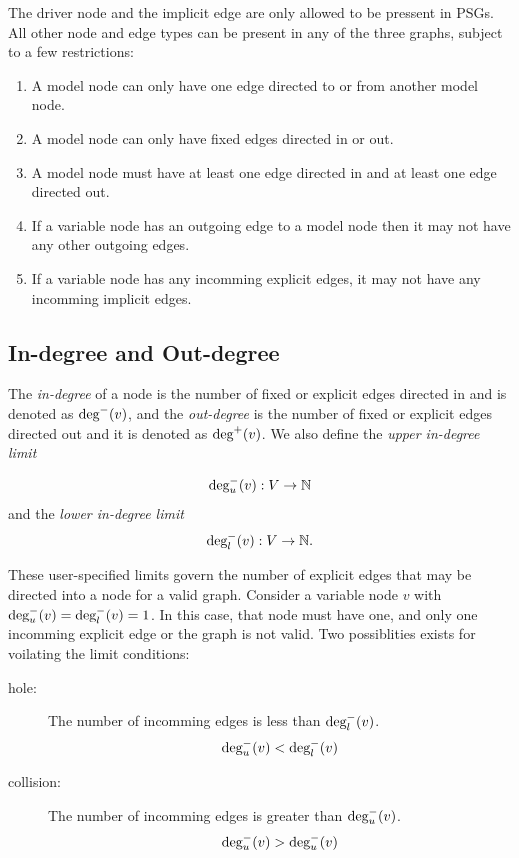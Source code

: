 The driver node and the implicit edge are only allowed to be pressent in PSGs. All 
other node and edge types can be present in any of the three graphs, subject to a 
few restrictions: 
\begin{enumerate}
\item A model node can only have one edge directed to or from another model node.
\item A model node can only have fixed edges directed in or out.
\item A model node must have at least one edge directed in and at least one edge 
  directed out.
\item If a variable node has an outgoing edge to a model node then it may not have 
  any other outgoing edges.
\item If a variable node has any incomming explicit edges, it may not have any 
  incomming implicit edges. 
\end{enumerate}

\subsection{In-degree and Out-degree}

The \emph{in-degree} of a node is the number of fixed or explicit edges directed in and 
is denoted as $\textrm{deg}^-(v)$, and the \emph{out-degree} 
is the number of fixed or explicit edges directed out and it is denoted as $\textrm{deg}^+(v)$.
We also define the \emph{upper in-degree limit} 

\begin{equation}
\textrm{deg}_u^-(v):V \to \mathbb{N}
\end{equation} 
and the \emph{lower in-degree limit}
\begin{equation}
\textrm{deg}_l^-(v):V \to \mathbb{N}.
\end{equation}

These user-specified limits govern the number of explicit edges that may be directed into a 
node for a valid graph. Consider a variable node $v$ with
$\textrm{deg}_u^-(v) = \textrm{deg}_l^-(v) = 1$. In this case, that node must have one, and only one
incomming explicit edge or the graph is not valid. Two possiblities exists for voilating 
the limit conditions: 
\begin{description}
  \item[hole: ] The number of incomming edges is less than $\textrm{deg}_l^-(v)$. 
    \begin{equation} \textrm{deg}_u^-(v) < \textrm{deg}_l^-(v) \label{e:hole} \end{equation} 

  \item[collision: ] The number of incomming edges is greater than $ \textrm{deg}_u^-(v)$. 
    \begin{equation} \textrm{deg}_u^-(v) > \textrm{deg}_u^-(v) \end{equation}
\end{description} 


